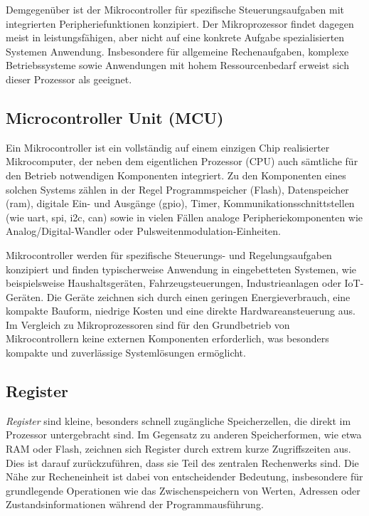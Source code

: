 Demgegenüber ist der Mikrocontroller für spezifische Steuerungsaufgaben mit integrierten Peripheriefunktionen konzipiert. 
Der Mikroprozessor findet dagegen meist in leistungsfähigen, aber nicht auf eine konkrete Aufgabe spezialisierten Systemen Anwendung. 
Insbesondere für allgemeine Rechenaufgaben, komplexe Betriebssysteme sowie Anwendungen mit hohem Ressourcenbedarf erweist sich dieser Prozessor als geeignet.

\subsection{Microcontroller Unit (MCU)}
Ein Mikrocontroller ist ein vollständig auf einem einzigen Chip realisierter Mikrocomputer, der neben dem eigentlichen Prozessor (CPU) auch sämtliche für den Betrieb notwendigen Komponenten integriert. 
Zu den Komponenten eines solchen Systems zählen in der Regel Programmspeicher (Flash), Datenspeicher (\gls{ram}), digitale Ein- und Ausgänge (\gls{gpio}), Timer, Kommunikationsschnittstellen (wie \gls{uart}, \gls{spi}, \gls{i2c}, \gls{can}) sowie in vielen Fällen analoge Peripheriekomponenten wie Analog/Digital-Wandler oder Pulsweitenmodulation-Einheiten.

Mikrocontroller werden für spezifische Steuerungs- und Regelungsaufgaben konzipiert und finden typischerweise Anwendung in eingebetteten Systemen, wie beispielsweise Haushaltsgeräten, Fahrzeugsteuerungen, Industrieanlagen oder IoT-Geräten. 
Die Geräte zeichnen sich durch einen geringen Energieverbrauch, eine kompakte Bauform, niedrige Kosten und eine direkte Hardwareansteuerung aus. 
Im Vergleich zu Mikroprozessoren sind für den Grundbetrieb von Mikrocontrollern keine externen Komponenten erforderlich, was besonders kompakte und zuverlässige Systemlösungen ermöglicht.


%


\subsection{Register}
\emph{Register} sind kleine, besonders schnell zugängliche Speicherzellen, die direkt im Prozessor untergebracht sind. 
Im Gegensatz zu anderen Speicherformen, wie etwa RAM oder Flash, zeichnen sich Register durch extrem kurze Zugriffszeiten aus. 
Dies ist darauf zurückzuführen, dass sie Teil des zentralen Rechenwerks sind. 
Die Nähe zur Recheneinheit ist dabei von entscheidender Bedeutung, insbesondere für grundlegende Operationen wie das Zwischenspeichern von Werten, Adressen oder Zustandsinformationen während der Programmausführung.

